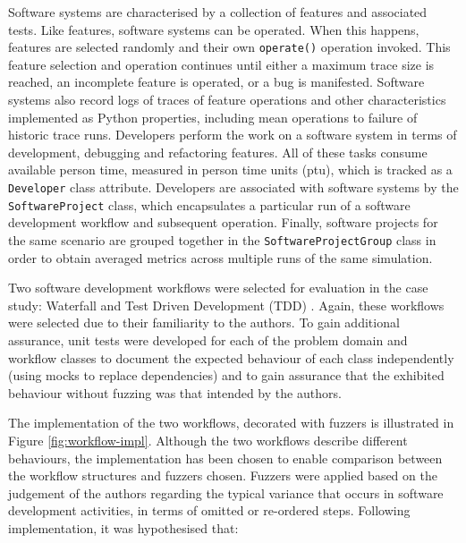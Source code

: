 \documentclass{sig-alternate}
\begin{document}
Software systems are characterised by a collection of features and associated tests.  Like features, software systems
can be operated.  When this happens, features are selected randomly and their own \lstinline!operate()!  operation
invoked.  This feature selection and operation continues until either a maximum trace size is reached, an incomplete
feature is operated, or a bug is manifested.  Software systems also record logs of traces of feature operations and
other characteristics implemented as Python properties, including mean operations to failure of historic trace runs.
Developers perform the work on a software system in terms of development, debugging and refactoring features.  All of
these tasks consume available person time, measured in person time units (ptu), which is tracked as a
\lstinline!Developer! class attribute.  Developers are associated with software systems by the
\lstinline!SoftwareProject! class, which encapsulates a particular run of a software development workflow and subsequent
operation.  Finally, software projects for the same scenario are grouped together in the
\lstinline!SoftwareProjectGroup! class in order to obtain averaged metrics across multiple runs of the same simulation.

Two software development workflows were selected for evaluation in the case study: Waterfall
\citep{benington83production} and Test Driven Development (TDD) \citep{beck02test}.  Again, these workflows were
selected due to their familiarity to the authors.  To gain additional assurance, unit tests were developed for each of
the problem domain and workflow classes to document the expected behaviour of each class independently (using mocks to
replace dependencies) and to gain assurance that the exhibited behaviour without fuzzing was that intended by the
authors.

The implementation of the two workflows, decorated with fuzzers is illustrated in Figure \ref{fig:workflow-impl}.
Although the two workflows describe different behaviours, the implementation has been chosen to enable comparison
between the workflow structures and fuzzers chosen.  Fuzzers were applied based on the judgement of the authors
regarding the typical variance that occurs in software development activities, in terms of omitted or re-ordered steps.
Following implementation, it was hypothesised that:
\end{document}
